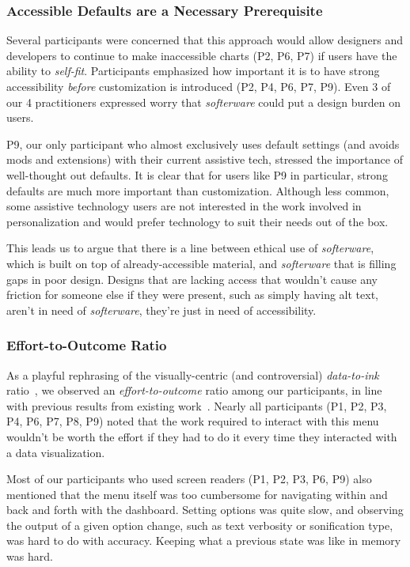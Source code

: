 \documentclass[12pt]{cmuthesis}
\begin{document}
\subsubsection{Accessible Defaults are a Necessary Prerequisite}
Several participants were concerned that this approach would allow designers and developers to continue to make inaccessible charts (P2, P6, P7) if users have the ability to \textit{self-fit}. Participants emphasized how important it is to have strong accessibility \textit{before} customization is introduced (P2, P4, P6, P7, P9). Even 3 of our 4 practitioners expressed worry that \textit{softerware} could put a design burden on users.

P9, our only participant who almost exclusively uses default settings (and avoids mods and extensions) with their current assistive tech, stressed the importance of well-thought out defaults. It is clear that for users like P9 in particular, strong defaults are much more important than customization. Although less common, some assistive technology users are not interested in the work involved in personalization and would prefer technology to suit their needs out of the box.

This leads us to argue that there is a line between ethical use of \textit{softerware}, which is built on top of already-accessible material, and \textit{softerware} that is filling gaps in poor design. Designs that are lacking access that wouldn't cause any friction for someone else if they were present, such as simply having alt text, aren't in need of \textit{softerware}, they're just in need of accessibility.

\subsubsection{Effort-to-Outcome Ratio}
As a playful rephrasing of the visually-centric (and controversial) \textit{data-to-ink} ratio~\cite{akbaba}, we observed an \textit{effort-to-outcome} ratio among our participants, in line with previous results from existing work~\cite{Wood2023}. Nearly all participants (P1, P2, P3, P4, P6, P7, P8, P9) noted that the work required to interact with this menu wouldn't be worth the effort if they had to do it every time they interacted with a data visualization.

Most of our participants who used screen readers (P1, P2, P3, P6, P9) also mentioned that the menu itself was too cumbersome for navigating within and back and forth with the dashboard. Setting options was quite slow, and observing the output of a given option change, such as text verbosity or sonification type, was hard to do with accuracy. Keeping what a previous state was like in memory was hard.
\end{document}
